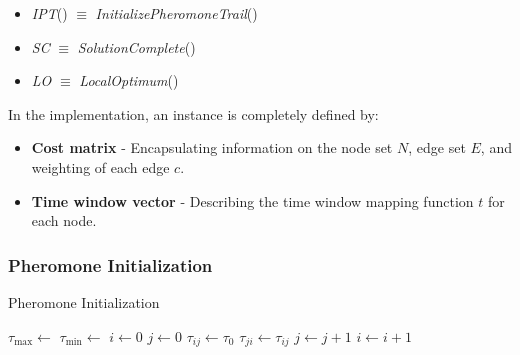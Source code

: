 \begin{homeworkProblem}
\begin{center}
\begin{minipage}{.45\textwidth}
\end{minipage}%
\hspace{1.5cm}
\begin{minipage}{.45\textwidth}
\centering
\begin{itemize}
  \item \emph{IPT}() $\equiv$ \emph{InitializePheromoneTrail}()
  \item \emph{SC} $\equiv$ \emph{SolutionComplete}()
  \item \emph{LO} $\equiv$ \emph{LocalOptimum}()
\end{itemize}
\end{minipage}
\end{center}

\newpage
In the implementation, an instance is completely defined by:
\begin{itemize}
\item \textbf{Cost matrix} - Encapsulating information on the node set $N$, edge set $E$, and weighting of each edge $c$.
\item \textbf{Time window vector} - Describing the time window mapping function $t$ for each node.
\end{itemize}

\subsubsection{Pheromone Initialization}
\begin{algorithm}[!h]
  \caption{Pheromone Initialization}\label{init}
  \begin{algorithmic}[1]
      \State $\tau_{\max} \gets $
      \State $\tau_{\min} \gets $
      \State $i \gets 0$
      \State $j \gets 0$
          \State $\tau_{ij} \gets \tau_0$
          \State $\tau_{ji} \gets \tau_{ij}$
          \State $ j \gets j + 1$  
        \EndFor
        \State $ i \gets i + 1$ 
      \EndFor
    \EndProcedure
\end{algorithmic}
\end{algorithm}


\end{homeworkProblem}

